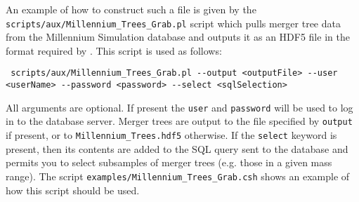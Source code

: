 An example of how to construct such a file is given by the {\tt scripts/aux/Millennium\_Trees\_Grab.pl} script which pulls merger tree data from the Millennium Simulation database and outputs it as an HDF5 file in the format required by \glc. This script is used as follows:
\begin{verbatim}
 scripts/aux/Millennium_Trees_Grab.pl --output <outputFile> --user <userName> --password <password> --select <sqlSelection>
\end{verbatim}
All arguments are optional. If present the {\tt user} and {\tt password} will be used to log in to the database server. Merger trees are output to the file specified by {\tt output} if present, or to {\tt Millennium\_Trees.hdf5} otherwise. If the {\tt select} keyword is present, then its contents are added to the SQL query sent to the database and permits you to select subsamples of merger trees (e.g. those in a given mass range). The script {\tt examples/Millennium\_Trees\_Grab.csh} shows an example of how this script should be used.


